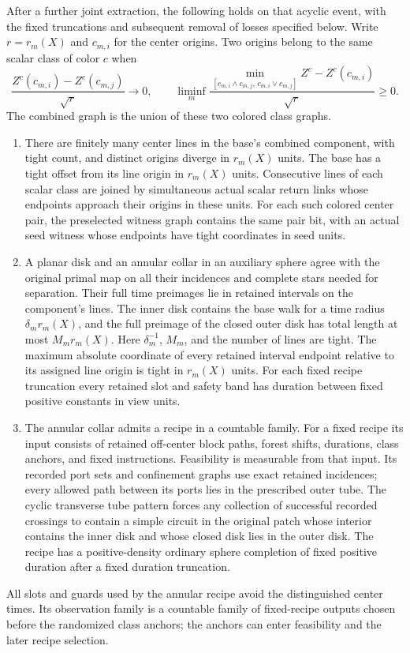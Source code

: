\begin{lemma}
After a further joint extraction, the following holds on that
acyclic event, with the fixed truncations and subsequent removal
of losses specified below.
Write \(r=r_m(X)\) and \(c_{m,i}\) for the center origins.
Two origins belong to the same scalar class of color \(c\) when
\[
 \frac{Z^c(c_{m,i})-Z^c(c_{m,j})}{\sqrt r}\longrightarrow0,
 \qquad
 \liminf_m\frac{\min_{[c_{m,i}\wedge c_{m,j},\,c_{m,i}\vee c_{m,j}]}
 Z^c-Z^c(c_{m,i})}{\sqrt r}\ge0.
\]
The combined graph is the union of these two colored class graphs.
\begin{enumerate}[label=(\roman*)]
\item There are finitely many center lines in the base's combined
component, with tight count, and distinct origins diverge in
\(r_m(X)\) units.  The base has a tight offset from its
line origin in \(r_m(X)\) units.  Consecutive lines of each scalar
class are joined by simultaneous actual scalar return links whose
endpoints approach their origins in these units.  For each such
colored center pair, the preselected witness graph contains the same
pair bit, with an actual seed witness whose endpoints have tight
coordinates in seed units.
\item A planar disk and an annular collar in an auxiliary sphere
agree with the original primal map on all their incidences and
complete stars needed for separation.  Their full time preimages
lie in retained intervals on the component's lines.  The inner disk contains the base walk
for a time radius \(\delta_m r_m(X)\), and the full preimage of
the closed outer disk has total length at most \(M_m r_m(X)\).
Here \(\delta_m^{-1}\), \(M_m\), and the number of lines are tight.
The maximum absolute coordinate of every retained interval endpoint
relative to its assigned line origin is tight in \(r_m(X)\) units.
For each fixed recipe truncation every retained slot and safety
band has duration between fixed positive constants in view units.
\item The annular collar admits a recipe in a countable family.
For a fixed recipe its input consists of retained off-center
block paths, forest shifts, durations, class anchors, and fixed
instructions.  Feasibility is measurable from that input.  Its
recorded port sets and confinement graphs use exact retained
incidences; every allowed path between its ports lies in the
prescribed outer tube.  The cyclic transverse tube pattern
forces any collection of successful recorded crossings to
contain a simple circuit in the original patch whose interior
contains the inner disk and whose closed disk lies in the outer disk.
The recipe has a positive-density ordinary sphere completion
of fixed positive duration after a fixed duration truncation.
\end{enumerate}
All slots and guards used by the annular recipe avoid the
distinguished center times.  Its observation family is a
countable family of fixed-recipe outputs chosen before the
randomized class anchors; the anchors can enter feasibility and
the later recipe selection.
\end{lemma}

